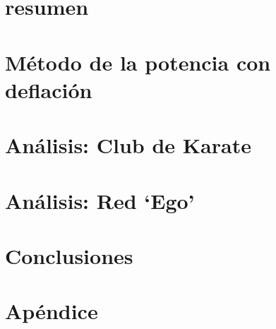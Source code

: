 

 



\section*{resumen}

\vspace{2em}

\tableofcontents
\newpage

\section{Método de la potencia con deflación}

\newpage

\section{Análisis: Club de Karate}

\newpage

\section{Análisis: Red `Ego'}

\newpage

\section{Conclusiones}

\newpage

\section{Apéndice}

\newpage

%
%

